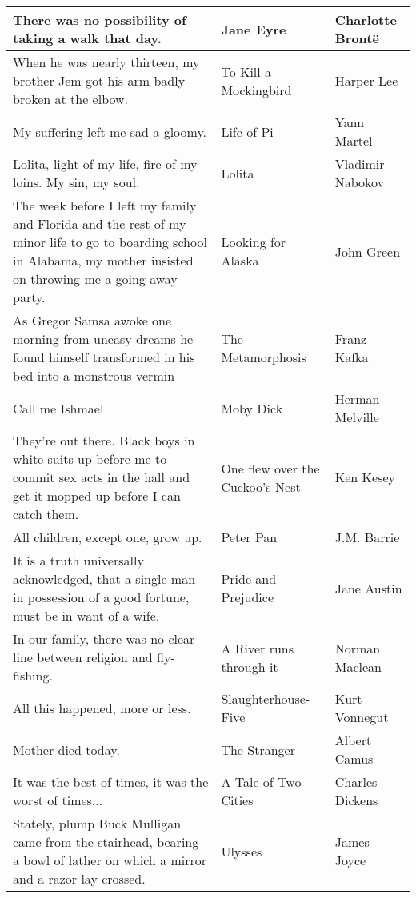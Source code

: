 \begin{longtable}{|p{3in}| p{1.4in}| p{1.4in}|}
			\hline
			There was no possibility of taking a walk that day. & Jane Eyre & Charlotte Bront\"e \\
			\hline
			When  he was nearly thirteen, my brother Jem got his arm badly broken at the elbow.  & To Kill a Mockingbird & Harper Lee \\
			\hline
			My suffering left me sad a gloomy.  & Life of Pi & Yann Martel \\
			\hline
			Lolita, light of my life, fire of my loins. My sin, my soul.  & Lolita & Vladimir Nabokov \\
			\hline
			The week before I left my family and Florida and the rest of my minor life to go to boarding school in Alabama, my mother insisted on throwing me a going-away party. & Looking for Alaska & John Green \\
			
			\hline
			As Gregor Samsa awoke one morning from uneasy dreams he found himself transformed in his bed into a monstrous vermin & The Metamorphosis & Franz Kafka \\
			\hline
			Call me Ishmael & Moby Dick &Herman Melville \\
			\hline
			They're out there.  Black boys in white suits up before me to commit sex acts in the hall and get it mopped up before I can catch them. & One flew over the Cuckoo's Nest & Ken Kesey \\ 
			\hline
			All children, except one, grow up. & Peter Pan & J.M. Barrie \\
			\hline
			It is a truth universally acknowledged, that a single man in possession of a good fortune, must be in want of a wife. & Pride and Prejudice & Jane Austin \\
			\hline
			In our family, there was no clear line between religion and fly-fishing. & A River runs through it & Norman Maclean \\
			\hline
			All this happened, more or less.  & Slaughterhouse-Five & Kurt Vonnegut \\
			\hline
			Mother died today. & The Stranger & Albert Camus \\
			\hline
			It was the best of times, it was the worst of times... & A Tale of Two Cities & Charles Dickens \\
			\hline
			Stately, plump Buck Mulligan came from the stairhead, bearing a bowl of lather on which a mirror and a razor lay crossed. & Ulysses & James Joyce\\
			\hline
			
			
			
			
		\end{longtable}
	
